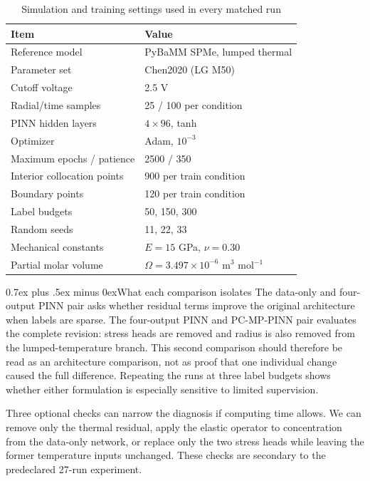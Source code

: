 \documentclass[conference]{IEEEtran}
\makeatletter
\newcommand{\headingfont}{\rmfamily}
\def\subsection{\@startsection{subsection}{2}{\z@}{1.5ex plus 1.5ex minus 0.5ex}%
{0.7ex plus .5ex minus 0ex}{\normalfont\headingfont\normalsize\bfseries}}
\newcommand{\modelname}{PC-MP-PINN}
\makeatother
\begin{document}
\begin{table}[t]
\centering
\caption{Simulation and training settings used in every matched run}
\label{tab:config}
\footnotesize
\setlength{\tabcolsep}{3.5pt}
\begin{tabular}{p{}p{}}
\toprule
Item & Value \\
\midrule
Reference model & PyBaMM SPMe, lumped thermal \\
Parameter set & Chen2020 (LG M50) \\
Cutoff voltage & 2.5 V \\
Radial/time samples & 25 / 100 per condition \\
PINN hidden layers & $4\times96$, tanh \\
Optimizer & Adam, $10^{-3}$ \\
Maximum epochs / patience & 2500 / 350 \\
Interior collocation points & 900 per train condition \\
Boundary points & 120 per train condition \\
Label budgets & 50, 150, 300 \\
Random seeds & 11, 22, 33 \\
Mechanical constants & $E=15$ GPa, $\nu=0.30$ \\
Partial molar volume & $\Omega=3.497\times10^{-6}$ m$^3$ mol$^{-1}$ \\
\bottomrule
\end{tabular}
\end{table}

\subsection{What each comparison isolates}
The data-only and four-output PINN pair asks whether residual terms improve the original architecture when labels are sparse. The four-output PINN and \modelname{} pair evaluates the complete revision: stress heads are removed and radius is also removed from the lumped-temperature branch. This second comparison should therefore be read as an architecture comparison, not as proof that one individual change caused the full difference. Repeating the runs at three label budgets shows whether either formulation is especially sensitive to limited supervision.

Three optional checks can narrow the diagnosis if computing time allows. We can remove only the thermal residual, apply the elastic operator to concentration from the data-only network, or replace only the two stress heads while leaving the former temperature inputs unchanged. These checks are secondary to the predeclared 27-run experiment.
\end{document}

